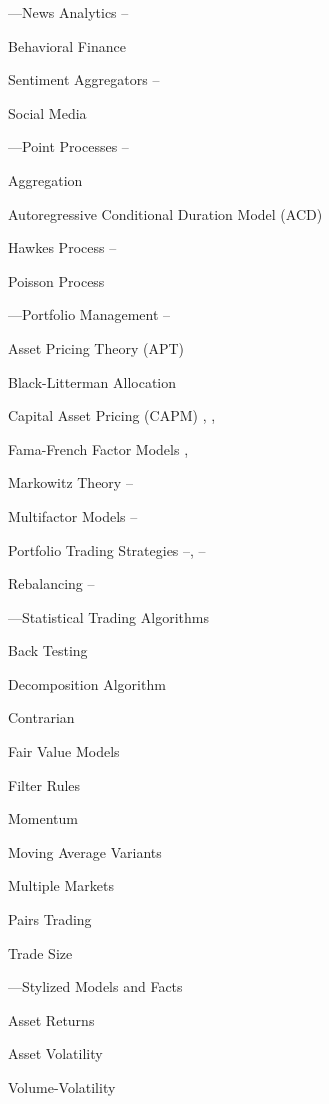 \begin{minipage}{0.40\textwidth}
\noindent ---News Analytics \pageref{in:newsan1}--\pageref{in:newsan2}
	\begin{flushright}
	Behavioral Finance \pageref{in:behave1} \par
	Sentiment Aggregators \pageref{in:sentag1}--\pageref{in:sentag2} \par
	Social Media \pageref{in:social} \par
	\end{flushright}

\noindent ---Point Processes \pageref{in:point1}--\pageref{in:point2}
	\begin{flushright}
	Aggregation \pageref{in:agg} \par
	Autoregressive Conditional Duration Model (ACD) \pageref{in:acd} \par
	Hawkes Process \pageref{in:hawk1}--\pageref{in:hawk2} \par
	Poisson Process \pageref{in:poisson}
	\end{flushright}

\noindent ---Portfolio Management \pageref{in:portman1}--\pageref{in:portman2}
	\begin{flushright}
	Asset Pricing Theory (APT) \pageref{in:apt} \par
	Black-Litterman Allocation \pageref{in:allo} \par 
	Capital Asset Pricing (CAPM) \pageref{in:capm1}, \pageref{in:capm2}, \pageref{in:capm3} \par
	Fama-French Factor Models \pageref{in:fama1}, \pageref{in:fama2} \par
	Markowitz Theory \pageref{in:mark1}--\pageref{in:mark2} \par
	Multifactor Models \pageref{in:mfm1}--\pageref{in:mfm2} \par
	Portfolio Trading Strategies \pageref{in:ports1}--\pageref{in:ports2}, \pageref{in:ports3}--\pageref{in:ports4} \par
	Rebalancing \pageref{in:rebalance1}--\pageref{in:rebalance2}
	\end{flushright}


\noindent ---Statistical Trading Algorithms
	\begin{flushright}
	Back Testing \par
	Decomposition Algorithm \par
	Contrarian \par
	Fair Value Models \par
	Filter Rules \par
	Momentum \par
	Moving Average Variants \par
	Multiple Markets \par
	Pairs Trading \par
	Trade Size 
	\end{flushright}


\noindent ---Stylized Models and Facts
	\begin{flushright}
	Asset Returns \par
	Asset Volatility \par
	Volume-Volatility 
	\end{flushright}
\end{minipage} \hfill
